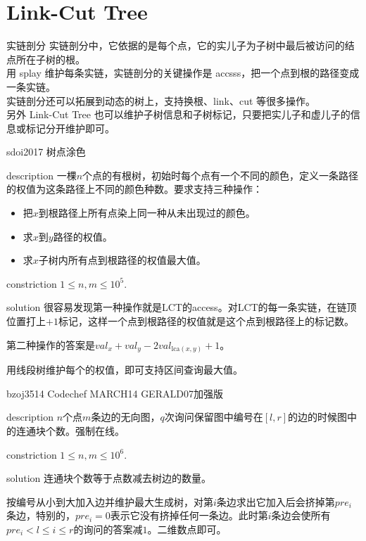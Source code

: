 \documentclass{beamer}
\begin{document}
	\section{Link-Cut Tree}
	\begin{frame}{实链剖分}
		实链剖分中，它依据的是每个点，它的实儿子为子树中最后被访问的结点所在子树的根。\\
		
		用 splay 维护每条实链，实链剖分的关键操作是 accsss，把一个点到根的路径变成一条实链。\\
		
		实链剖分还可以拓展到动态的树上，支持换根、link、cut 等很多操作。\\
		
		另外 Link-Cut Tree 也可以维护子树信息和子树标记，只要把实儿子和虚儿子的信息或标记分开维护即可。
		
	\end{frame}
	\begin{frame}{sdoi2017 树点涂色}
		\begin{block}{description}
			一棵$n$个点的有根树，初始时每个点有一个不同的颜色，定义一条路径的权值为这条路径上不同的颜色种数。要求支持三种操作：
			\begin{itemize}
				\item 把$x$到根路径上所有点染上同一种从未出现过的颜色。
				\item 求$x$到$y$路径的权值。
				\item 求$x$子树内所有点到根路径的权值最大值。
			\end{itemize}
		\end{block}
		\begin{block}{constriction}
			$1 \le n, m \le 10^5.$
		\end{block}
		\pause
		\begin{block}{solution}
			很容易发现第一种操作就是LCT的access。对LCT的每一条实链，在链顶位置打上$+1$标记，这样一个点到根路径的权值就是这个点到根路径上的标记数。
			
			第二种操作的答案是$val_x+val_y-2val_{\mathrm{lca}(x,y)}+1$。
			
			用线段树维护每个的权值，即可支持区间查询最大值。
		\end{block}
	\end{frame}
	\begin{frame}{bzoj3514 Codechef MARCH14 GERALD07加强版}
		\begin{block}{description}
			$n$个点$m$条边的无向图，$q$次询问保留图中编号在$[l,r]$的边的时候图中的连通块个数。强制在线。
		\end{block}
		\begin{block}{constriction}
			$1 \le n, m \le 10^6.$
		\end{block}
		\pause
		\begin{block}{solution}
			连通块个数等于点数减去树边的数量。
			
			按编号从小到大加入边并维护最大生成树，对第$i$条边求出它加入后会挤掉第$pre_i$条边，特别的，$pre_i=0$表示它没有挤掉任何一条边。此时第$i$条边会使所有$pre_i < l \le i \le r$的询问的答案减$1$。二维数点即可。
		\end{block}
	\end{frame}
\end{document}
